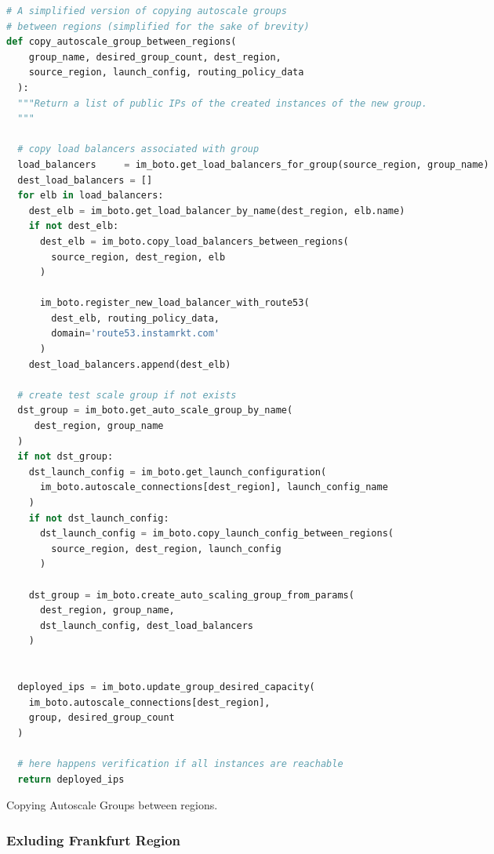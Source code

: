 \documentclass{uvamscse}
\begin{document}
\begin{sourcecode}[H]
\begin{lstlisting}[style=mono, language=Python]
# A simplified version of copying autoscale groups
# between regions (simplified for the sake of brevity)
def copy_autoscale_group_between_regions(
    group_name, desired_group_count, dest_region,
    source_region, launch_config, routing_policy_data
  ):
  """Return a list of public IPs of the created instances of the new group.
  """

  # copy load balancers associated with group
  load_balancers     = im_boto.get_load_balancers_for_group(source_region, group_name)
  dest_load_balancers = []
  for elb in load_balancers:
    dest_elb = im_boto.get_load_balancer_by_name(dest_region, elb.name)
    if not dest_elb:
      dest_elb = im_boto.copy_load_balancers_between_regions(
        source_region, dest_region, elb
      )

      im_boto.register_new_load_balancer_with_route53(
        dest_elb, routing_policy_data,
        domain='route53.instamrkt.com'
      )
    dest_load_balancers.append(dest_elb)

  # create test scale group if not exists
  dst_group = im_boto.get_auto_scale_group_by_name(
     dest_region, group_name
  )
  if not dst_group:
    dst_launch_config = im_boto.get_launch_configuration(
      im_boto.autoscale_connections[dest_region], launch_config_name
    )
    if not dst_launch_config:
      dst_launch_config = im_boto.copy_launch_config_between_regions(
        source_region, dest_region, launch_config
      )

    dst_group = im_boto.create_auto_scaling_group_from_params(
      dest_region, group_name,
      dst_launch_config, dest_load_balancers
    )


  deployed_ips = im_boto.update_group_desired_capacity(
    im_boto.autoscale_connections[dest_region],
    group, desired_group_count
  )

  # here happens verification if all instances are reachable
  return deployed_ips
\end{lstlisting}
\caption{Copying Autoscale Groups between regions.}
\label{lstlisting:copygroups}
\end{sourcecode}

\subsubsection{Exluding Frankfurt Region}\label{Exluding Frankfurt Region}
\end{document}
